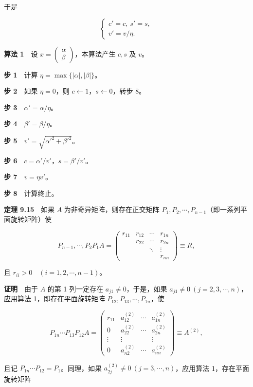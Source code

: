 于是

\[
\begin{cases}c'=c,\ s'=s,\\v'=v/\eta.\end{cases}
\]

\textbf{算法 1}　设 \(x=\begin{pmatrix}\alpha\\\beta\end{pmatrix}\)，本算法产生 \(c,s\) 及 \(v\)。

\textbf{步 1}　计算 \(\eta=\max\{|\alpha|,|\beta|\}\)。

\textbf{步 2}　如果 \(\eta=0\)，则 \(c\leftarrow1\)，\(s\leftarrow0\)，转步 8。

\textbf{步 3}　\(\alpha'=\alpha/\eta\)。

\textbf{步 4}　\(\beta'=\beta/\eta\)。

\textbf{步 5}　\(v'=\sqrt{\alpha'^2+\beta'^2}\)。

\textbf{步 6}　\(c=\alpha'/v'\)，\(s=\beta'/v'\)。

\textbf{步 7}　\(v=\eta v'\)。

\textbf{步 8}　计算终止。

\textbf{定理 9.15}　如果 \(A\) 为非奇异矩阵，则存在正交矩阵 \(P_1,P_2,\cdots,P_{n-1}\)（即一系列平面旋转矩阵）使

\[
P_{n-1},\cdots,P_2P_1A=\begin{pmatrix}
r_{11}&r_{12}&\cdots&r_{1n}\\
&r_{22}&\cdots&r_{2n}\\
&&\ddots&\vdots\\
&&&r_{nn}
\end{pmatrix}\equiv R,
\tag{9.4.5}
\]

且 \(r_{ii}>0\quad(i=1,2,\cdots,n-1)\)。

\textbf{证明}　由于 \(A\) 的第 1 列一定存在 \(a_{j1}\ne0\)，于是，如果 \(a_{j1}\ne0\ (j=2,3,\cdots,n)\)，应用算法 1，即存在平面旋转矩阵 \(P_{12},P_{13},\cdots,P_{1n}\)，使

\[
P_{1n}\cdots P_{13}P_{12}A=\begin{pmatrix}
r_{11}&a_{12}^{(2)}&\cdots&a_{1n}^{(2)}\\
0&a_{22}^{(2)}&\cdots&a_{2n}^{(2)}\\
\vdots&\vdots&&\vdots\\
0&a_{n2}^{(2)}&\cdots&a_{nn}^{(2)}
\end{pmatrix}\equiv A^{(2)},
\]

且记 \(P_{1n}\cdots P_{12}=P_1\)。同理，如果 \(a_{2j}^{(2)}\ne0\ (j=3,\cdots,n)\)，应用算法 1，存在平面旋转矩阵

